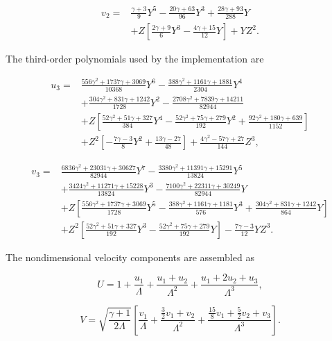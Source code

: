 \begin{align}
v_2={}&
    \frac{\gamma+3}{9}Y^5
    -\frac{20\gamma+63}{96}Y^3
    +\frac{28\gamma+93}{288}Y \nonumber\\
    &+Z\left[
        \frac{2\gamma+9}{6}Y^3
        -\frac{4\gamma+15}{12}Y
    \right]
    +YZ^2.
\end{align}

The third-order polynomials used by the implementation are

\begin{align}
u_3={}&
 \frac{556\gamma^2+1737\gamma+3069}{10368}Y^6
-\frac{388\gamma^2+1161\gamma+1881}{2304}Y^4 \nonumber\\
&+\frac{304\gamma^2+831\gamma+1242}{1728}Y^2
-\frac{2708\gamma^2+7839\gamma+14211}{82944} \nonumber\\
&+Z\left[
 \frac{52\gamma^2+51\gamma+327}{384}Y^4
-\frac{52\gamma^2+75\gamma+279}{192}Y^2
+\frac{92\gamma^2+180\gamma+639}{1152}
\right] \nonumber\\
&+Z^2\left[-\frac{7\gamma-3}{8}Y^2
+\frac{13\gamma-27}{48}\right]
+\frac{4\gamma^2-57\gamma+27}{144}Z^3,
\end{align}

\begin{align}
v_3={}&
 \frac{6836\gamma^2+23031\gamma+30627}{82944}Y^7
-\frac{3380\gamma^2+11391\gamma+15291}{13824}Y^5 \nonumber\\
&+\frac{3424\gamma^2+11271\gamma+15228}{13824}Y^3
-\frac{7100\gamma^2+22311\gamma+30249}{82944}Y \nonumber\\
&+Z\left[
 \frac{556\gamma^2+1737\gamma+3069}{1728}Y^5
-\frac{388\gamma^2+1161\gamma+1181}{576}Y^3
+\frac{304\gamma^2+831\gamma+1242}{864}Y
\right] \nonumber\\
&+Z^2\left[
 \frac{52\gamma^2+51\gamma+327}{192}Y^3
-\frac{52\gamma^2+75\gamma+279}{192}Y
\right]
-\frac{7\gamma-3}{12}YZ^3.
\end{align}

The nondimensional velocity components are assembled as

\begin{equation}
\boxed{
U=
1+\frac{u_1}{\Lambda}
+\frac{u_1+u_2}{\Lambda^2}
+\frac{u_1+2u_2+u_3}{\Lambda^3}
},
\label{eq:kl_axial_velocity}
\end{equation}

\begin{equation}
\boxed{
V=
\sqrt{\frac{\gamma+1}{2\Lambda}}
\left[
\frac{v_1}{\Lambda}
+\frac{\frac32v_1+v_2}{\Lambda^2}
+\frac{\frac{15}{8}v_1+\frac52v_2+v_3}{\Lambda^3}
\right]
}.
\label{eq:kl_radial_velocity}
\end{equation}

